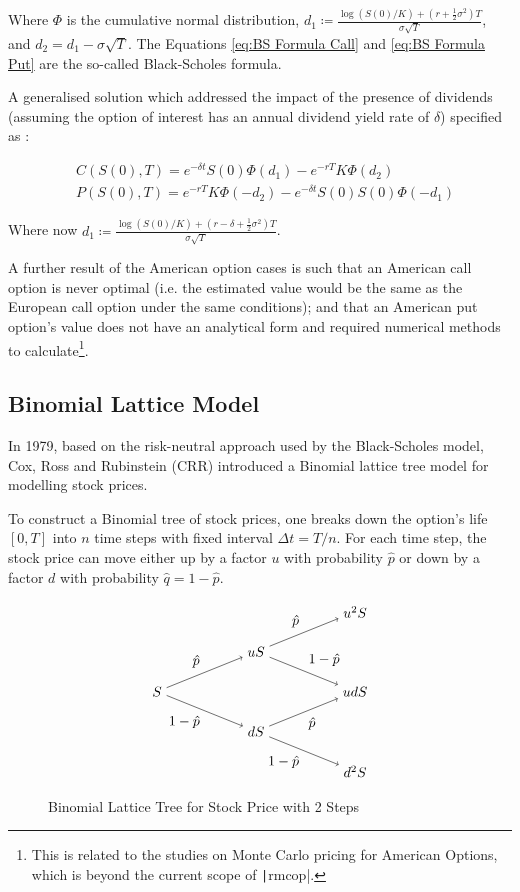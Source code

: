 Where $\Phi$ is the cumulative normal distribution, $d_1 \coloneqq \frac{\log(S(0)/K)+(r+\frac{1}{2}\sigma^2)T}{\sigma\sqrt{T}}$, and $d_2 = d_1 - \sigma\sqrt{T}$. The Equations \ref{eq:BS Formula Call} and \ref{eq:BS Formula Put} are the so-called Black-Scholes formula.

A generalised solution which addressed the impact of the presence of dividends (assuming the option of interest has an annual dividend yield rate of $\delta$) specified as \cite{Glasserman2003}:

\begin{align}
	&C(S(0), T) = e^{-\delta t}S(0)\Phi(d_1) - e^{-rT}K\Phi(d_2) \label{eq:BS Formula Call} \\
	&P(S(0), T) = e^{-rT}K\Phi(-d_2) - e^{-\delta t}S(0)S(0)\Phi(-d_1) \label{eq:BS Formula Put}
\end{align}

Where now $d_1 \coloneqq \frac{\log(S(0)/K)+(r-\delta+\frac{1}{2}\sigma^2)T}{\sigma\sqrt{T}}$.

A further result of the American option cases is such that an American call option is never optimal (i.e. the estimated value would be the same as the European call option under the same conditions); and that an American put option's value does not have an analytical form and required numerical methods to calculate\footnote{This is related to the studies on Monte Carlo pricing for American Options, which is beyond the current scope of \texttt|rmcop|.}.

\subsection{Binomial Lattice Model}

In 1979, based on the risk-neutral approach used by the Black-Scholes model, Cox, Ross and Rubinstein (CRR) \cite{CRR1979} introduced a Binomial lattice tree model for modelling stock prices.

To construct a Binomial tree of stock prices, one breaks down the option's life $[0,T]$ into $n$ time steps with fixed interval $\Delta t=T/n$. For each time step, the stock price can move either up by a factor $u$ with probability $\hat{p}$ or down by a factor $d$ with probability $\hat{q}=1-\hat{p}$.

\begin{figure}[H]
    \centering
    \[\tikz{
        \node (a) at (0, 2) {$S$};
        \node (b) at (2.5, 3) {$uS$};
        \node (c) at (2.5, 1) {$dS$};
		\node (d) at (5, 4) {$u^2S$};
        \node (e) at (5, 2) {$udS$};
		\node (f) at (5, 0) {$d^2S$};
        \path[->] (a) edge node [above left] {$\hat{p}$} (b)
				  (a) edge node [below left] {$1-\hat{p}$} (c);
		\path[->] (b) edge node [above left] {$\hat{p}$} (d)
        		  (b) edge node [above right] {$1-\hat{p}$} (e);
		\path[->] (c) edge node [below right] {$\hat{p}$} (e)
        		  (c) edge node [below left] {$1-\hat{p}$} (f);
    }\]
    \caption{Binomial Lattice Tree for Stock Price with 2 Steps} \label{gph:binomial_tree}
\end{figure}

